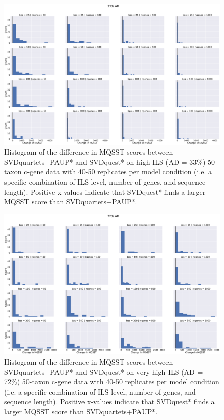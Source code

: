 \begin{figure}
\includegraphics[width=\textwidth]{svdquest-figs/all-scorediffs-hist-cgenes-33.eps}
\caption[Histogram of differences in MQSST scores between SVDquartets+PAUP* and SVDquest*  for the high ILS 50-taxon datasets]{Histogram of the difference in MQSST scores between
  SVDquartets+PAUP* and SVDquest*   on high ILS 
  (AD = 33\%) 50-taxon c-gene data
  with 40-50 replicates per model condition (i.e. a specific combination of ILS level, number of genes, and sequence length). 
  Positive x-values
  indicate that SVDquest* finds a larger MQSST score than
  SVDquartets+PAUP*.
}
\label{fig:s2}
\end{figure}

\clearpage

\begin{figure}
\includegraphics[width=\textwidth]{svdquest-figs/all-scorediffs-hist-cgenes-72.eps}
\caption[Histogram of differences in MQSST scores between SVDquartets+PAUP* and SVDquest*  for the very high ILS 50-taxon datasets]{Histogram of the difference in MQSST scores between
  SVDquartets+PAUP* and SVDquest*  on very high ILS (AD = 72\%) 50-taxon c-gene data
  with 40-50 replicates per model condition (i.e. a specific combination of ILS level, number of genes, and sequence length). Positive x-values
  indicate that SVDquest* finds a larger MQSST score than
  SVDquartets+PAUP*.
}
\label{fig:s3}
\end{figure}

